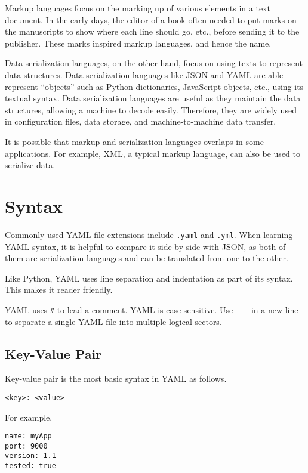 \begin{mdframed}

Markup languages focus on the marking up of various elements in a text document. In the early days, the editor of a book often needed to put marks on the manuscripts to show where each line should go, etc., before sending it to the publisher. These marks inspired markup languages, and hence the name.

Data serialization languages, on the other hand, focus on using texts to represent data structures. Data serialization languages like JSON and YAML are able represent ``objects'' such as Python dictionaries, JavaScript objects, etc., using its textual syntax. Data serialization languages are useful as they maintain the data structures, allowing a machine to decode easily. Therefore, they are widely used in configuration files, data storage, and machine-to-machine data transfer.

It is possible that markup and serialization languages overlaps in some applications. For example, XML, a typical markup language, can also be used to serialize data.

\end{mdframed}

\section{Syntax}

Commonly used YAML file extensions include \verb|.yaml| and \verb|.yml|. When learning YAML syntax, it is helpful to compare it side-by-side with JSON, as both of them are serialization languages and can be translated from one to the other.

Like Python, YAML uses line separation and indentation as part of its syntax. This makes it reader friendly.

YAML uses \verb|#| to lead a comment. YAML is case-sensitive. Use \verb|---| in a new line to separate a single YAML file into multiple logical sectors.

\subsection{Key-Value Pair}

Key-value pair is the most basic syntax in YAML as follows.
\begin{lstlisting}
<key>: <value>
\end{lstlisting}
For example,
\begin{lstlisting}
name: myApp
port: 9000
version: 1.1
tested: true
\end{lstlisting}

